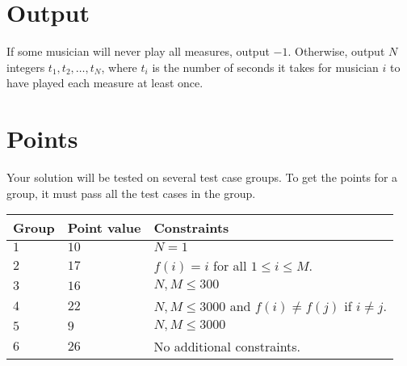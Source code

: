 \section*{Output}
If some musician will never play all measures, output $-1$.
Otherwise, output $N$ integers $t_1, t_2, \dots, t_N$, where $t_i$ is the number of seconds it takes for musician
$i$ to have played each measure at least once. 

\section*{Points}
Your solution will be tested on several test case groups.
To get the points for a group, it must pass all the test cases in the group.

\noindent
\begin{tabular}{| l | l | p{12cm} |}
  \hline
  \textbf{Group} & \textbf{Point value} & \textbf{Constraints} \\ \hline
  $1$    & $10$       & $N = 1$ \\ \hline
  $2$    & $17$       & $f(i) = i$ for all $1 \leq i \leq M$. \\ \hline
  $3$    & $16$       & $N,M \leq 300$ \\ \hline
  $4$    & $22$       & $N,M \leq 3000$ and $f(i) \neq f(j)$ if $i \neq j$. \\ \hline
  $5$    & $9$        & $N,M \leq 3000$  \\ \hline
  $6$    & $26$       & No additional constraints. \\ \hline
\end{tabular}


